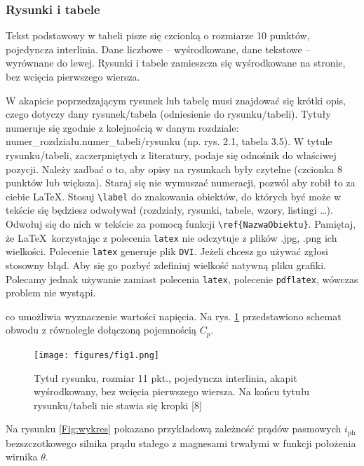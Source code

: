 \documentclass[12pt]{article}
\begin{document}
\clearpage


\subsubsection{Rysunki i tabele} \label{Subsec:Rysunki-i-tabele}
Tekst podstawowy w tabeli pisze się czcionką o rozmiarze 10 punktów, pojedyncza interlinia. Dane liczbowe – wyśrodkowane, dane tekstowe – wyrównane do lewej. Rysunki i tabele zamieszcza się wyśrodkowane na stronie, bez wcięcia pierwszego wiersza.

W akapicie poprzedzającym rysunek lub tabelę musi znajdować się krótki opis, czego dotyczy dany rysunek/tabela (odniesienie do rysunku/tabeli). Tytuły numeruje się zgodnie z kolejnością w danym rozdziale: numer\_rozdziału.numer\_tabeli/rysunku (np. rys. 2.1, tabela 3.5). W tytule rysunku/tabeli, zaczerpniętych z literatury, podaje się odnośnik do właściwej pozycji. Należy zadbać o to, aby opisy na rysunkach były czytelne (czcionka 8 punktów lub większa). Staraj się nie wymuszać numeracji, pozwól aby robił to za ciebie \LaTeX. Stosuj \verb!\label! do znakowania obiektów, do których być może w tekście się będziesz odwoływał (rozdziały, rysunki, tabele, wzory, listingi \ldots). Odwołuj się do nich w tekście  za pomocą funkcji \verb!\ref{NazwaObiektu}!. Pamiętaj, że \LaTeX\, korzystając z polecenia \verb|latex| nie odczytuje z plików .jpg, .png ich wielkości. Polecenie \verb|latex| generuje plik \verb|DVI|. Jeżeli chcesz go używać zgłosi stosowny błąd. Aby się go pozbyć zdefiniuj wielkość natywną pliku grafiki. Polecamy jednak używanie zamiast polecenia \verb|latex|, polecenie \verb|pdflatex|, wówczas problem nie wystąpi.\\

\begin{example}
	[\ldots] co umożliwia wyznaczenie wartości napięcia. Na rys. \ref{Fig:schemat} przedstawiono schemat obwodu z równolegle dołączoną pojemnością $C_p$.
\end{example}

\begin{figure}[ht]
	\centering
	\texttt{[image: figures/fig1.png]}
	\caption{Tytuł rysunku, rozmiar 11 pkt., pojedyncza interlinia, akapit wyśrodkowany, bez wcięcia pierwszego wiersza. Na końcu tytułu rysunku/tabeli nie stawia się kropki [8]}
	\label{Fig:schemat}
\end{figure}

\begin{example}
	[\ldots] Na rysunku \ref{Fig:wykres} pokazano przykładową zależność prądów pasmowych $i_\mathrm{ph}$ bezszczotkowego silnika prądu stałego z magnesami trwałymi w funkcji położenia wirnika $\theta$.
\end{example}
\end{document}
